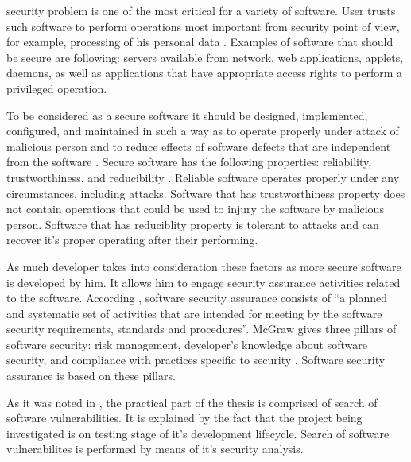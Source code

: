 %
\TThe security problem is one of the most critical for a variety of software. 
%
User trusts such software to perform operations most important from security point of view, for example, processing of his personal data . 
%
Examples of software that should be secure are following: servers available from network, web applications, applets, daemons, as well as applications that have appropriate access rights to perform a privileged operation. 

%
To be considered as a secure software it should be designed, implemented, configured, and maintained in such a way as to operate properly under attack of \A malicious person and to reduce effects of software defects that are independent from the software . 
%
Secure software has the following properties: reliability, trustworthiness, and reducibility . 
%
Reliable software operates properly under any circumstances, including attacks. 
%
Software that has trustworthiness property does not contain operations that could be used to injury the software by \A malicious person. 
%
Software that has reduciblity property is tolerant to attacks and can recover it's proper operating after their performing. 

%
As much developer takes into consideration these factors as more secure software is developed by him. 
%
It allows him to engage security assurance activities related to the software. 
%
According , software security assurance consists of ``a planned and systematic set of activities that are intended for meeting by the software security requirements, standards and procedures''. 
%
McGraw gives three pillars of software security: risk management, developer's knowledge about software security, and compliance with practices specific to security .
%
Software security assurance is based on these pillars. 

%
As it was noted in , the practical part of the thesis is comprised of search of software vulnerabilities. 
%
It is explained by the fact that the project being investigated is on \A testing stage of it's development lifecycle. 
%
Search of software vulnerabilites is performed by means of it's security analysis. 